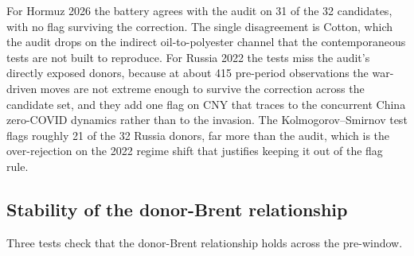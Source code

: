 For Hormuz 2026 the battery agrees with the audit on 31 of the 32 candidates, with no flag
surviving the correction. The single disagreement is Cotton, which the audit drops on the
indirect oil-to-polyester channel that the contemporaneous tests are not built to reproduce.
For Russia 2022 the tests miss the audit's directly exposed donors, because at about 415
pre-period observations the war-driven moves are not extreme enough to survive the correction
across the candidate set, and they add one flag on CNY that traces to the concurrent China
zero-COVID dynamics rather than to the invasion. The Kolmogorov--Smirnov test flags roughly
21 of the 32 Russia donors, far more than the audit, which is the over-rejection on the 2022
regime shift that justifies keeping it out of the flag rule.

\subsection{Stability of the donor-Brent relationship}
Three tests check that the donor-Brent relationship holds across the pre-window.

